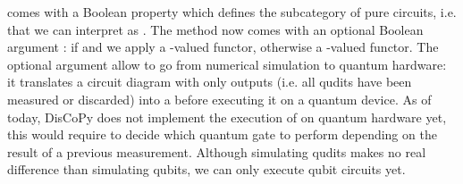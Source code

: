  comes with a Boolean property  which defines the subcategory of pure circuits, i.e. that we can interpret as .
The  method now comes with an optional Boolean argument : if  and  we apply a -valued functor, otherwise a -valued functor.
The optional  argument allow to go from numerical simulation to quantum hardware: it translates a circuit diagram with only  outputs (i.e. all qudits have been measured or discarded) into a  before executing it on a quantum device.
As of today, DisCoPy does not implement the execution of  on quantum hardware yet, this would require to decide which quantum gate to perform depending on the result of a previous measurement.
Although simulating qudits makes no real difference than simulating qubits, we can only execute qubit circuits yet.

